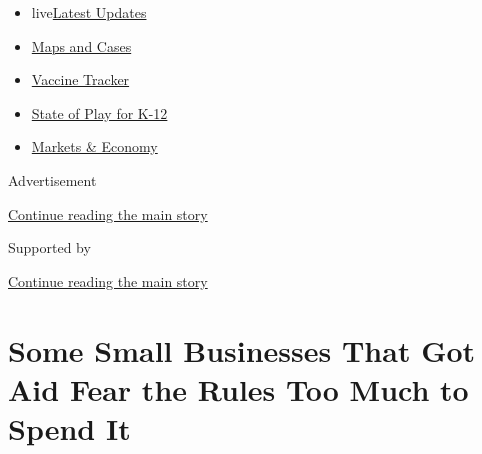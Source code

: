 \begin{itemize}
\tightlist
\item
  live\href{https://www.nytimes3xbfgragh.onion/2020/08/17/world/coronavirus-covid.html?name=styln-coronavirus-markets\&region=TOP_BANNER\&variant=undefined\&block=storyline_menu_recirc\&action=click\&pgtype=Article\&impression_id=3c771801-e107-11ea-8db3-f56620f69f1a}{Latest
  Updates}
\item
  \href{https://www.nytimes3xbfgragh.onion/interactive/2020/us/coronavirus-us-cases.html?name=styln-coronavirus-markets\&region=TOP_BANNER\&variant=undefined\&block=storyline_menu_recirc\&action=click\&pgtype=Article\&impression_id=3c771802-e107-11ea-8db3-f56620f69f1a}{Maps
  and Cases}
\item
  \href{https://www.nytimes3xbfgragh.onion/interactive/2020/science/coronavirus-vaccine-tracker.html?name=styln-coronavirus-markets\&region=TOP_BANNER\&variant=undefined\&block=storyline_menu_recirc\&action=click\&pgtype=Article\&impression_id=3c771803-e107-11ea-8db3-f56620f69f1a}{Vaccine
  Tracker}
\item
  \href{https://www.nytimes3xbfgragh.onion/2020/08/17/us/k-12-schools-reopening.html?name=styln-coronavirus-markets\&region=TOP_BANNER\&variant=undefined\&block=storyline_menu_recirc\&action=click\&pgtype=Article\&impression_id=3c771804-e107-11ea-8db3-f56620f69f1a}{State
  of Play for K-12}
\item
  \href{https://www.nytimes3xbfgragh.onion/live/2020/08/17/business/stock-market-today-coronavirus?name=styln-coronavirus-markets\&region=TOP_BANNER\&variant=undefined\&block=storyline_menu_recirc\&action=click\&pgtype=Article\&impression_id=3c771805-e107-11ea-8db3-f56620f69f1a}{Markets
  \& Economy}
\end{itemize}

Advertisement

\protect\hyperlink{after-top}{Continue reading the main story}

Supported by

\protect\hyperlink{after-sponsor}{Continue reading the main story}

\hypertarget{some-small-businesses-that-got-aid-fear-the-rules-too-much-to-spend-it}{%
\section{Some Small Businesses That Got Aid Fear the Rules Too Much to
Spend
It}\label{some-small-businesses-that-got-aid-fear-the-rules-too-much-to-spend-it}}


